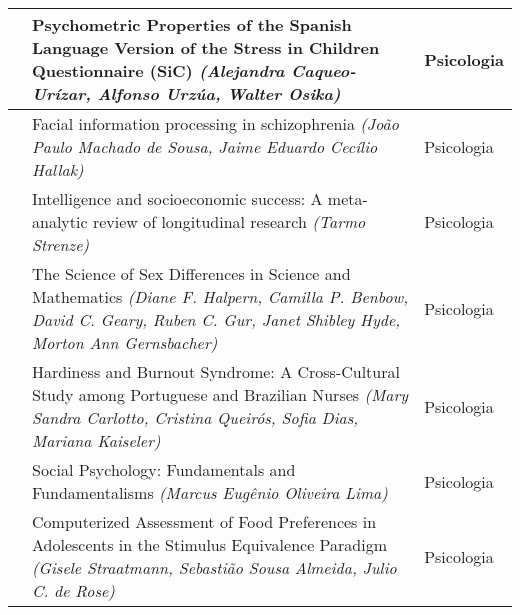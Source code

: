 \begin{flushleft}
\begin{longtable}{|C{0.6cm}|m{10.1cm}|C{4cm}|}
	    \hline
	    \rownumber & Psychometric Properties of the Spanish Language Version of the Stress in Children Questionnaire (SiC) \textit{(Alejandra Caqueo-Urízar, Alfonso Urzúa, Walter Osika)} & Psicologia \\
	    \hline
	    \rownumber & Facial information processing in schizophrenia \textit{(João Paulo Machado de Sousa, Jaime Eduardo Cecílio Hallak)} & Psicologia \\
	    \hline
	    \rownumber & Intelligence and socioeconomic success: A meta-analytic review of longitudinal research \textit{(Tarmo Strenze)} & Psicologia \\
	    \hline
	    \rownumber & The Science of Sex Differences in Science and Mathematics \textit{(Diane F. Halpern, Camilla P. Benbow, David C. Geary, Ruben C. Gur, Janet Shibley Hyde, Morton Ann Gernsbacher)} & Psicologia \\
	    \hline
	    \rownumber & Hardiness and Burnout Syndrome: A Cross-Cultural Study among Portuguese and Brazilian Nurses \textit{(Mary Sandra Carlotto, Cristina Queirós, Sofia Dias, Mariana Kaiseler)} & Psicologia \\
	    \hline
	    \rownumber & Social Psychology: Fundamentals and Fundamentalisms \textit{(Marcus Eugênio Oliveira Lima)} & Psicologia \\
	    \hline
	    \rownumber & Computerized Assessment of Food Preferences in Adolescents in the Stimulus Equivalence Paradigm \textit{(Gisele Straatmann, Sebastião Sousa Almeida, Julio C. de Rose)} & Psicologia \\
	    
	    \hline
	\end{longtable}
\end{flushleft}